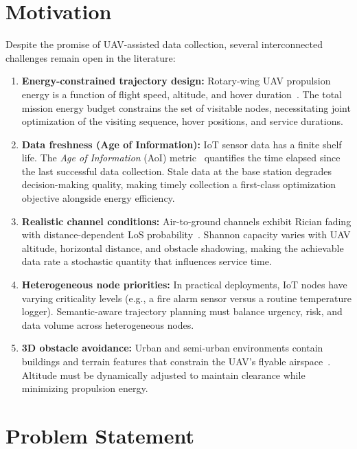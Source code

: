 \documentclass[12pt, a4paper, oneside]{report}
\begin{document}
\section{Motivation}

Despite the promise of UAV-assisted data collection, several interconnected challenges remain open in the literature:

\begin{enumerate}[label=(\roman*)]
    \item \textbf{Energy-constrained trajectory design:} Rotary-wing UAV propulsion energy is a function of flight speed, altitude, and hover duration~\cite{zeng2019energy}. The total mission energy budget constrains the set of visitable nodes, necessitating joint optimization of the visiting sequence, hover positions, and service durations.

    \item \textbf{Data freshness (Age of Information):} IoT sensor data has a finite shelf life. The \textit{Age of Information} (AoI) metric~\cite{kaul2012status} quantifies the time elapsed since the last successful data collection. Stale data at the base station degrades decision-making quality, making timely collection a first-class optimization objective alongside energy efficiency.

    \item \textbf{Realistic channel conditions:} Air-to-ground channels exhibit Rician fading with distance-dependent LoS probability~\cite{khuwaja2018survey}. Shannon capacity varies with UAV altitude, horizontal distance, and obstacle shadowing, making the achievable data rate a stochastic quantity that influences service time.

    \item \textbf{Heterogeneous node priorities:} In practical deployments, IoT nodes have varying criticality levels (e.g., a fire alarm sensor versus a routine temperature logger). Semantic-aware trajectory planning must balance urgency, risk, and data volume across heterogeneous nodes.

    \item \textbf{3D obstacle avoidance:} Urban and semi-urban environments contain buildings and terrain features that constrain the UAV's flyable airspace~\cite{aggarwal2020path}. Altitude must be dynamically adjusted to maintain clearance while minimizing propulsion energy.
\end{enumerate}

\section{Problem Statement}
\end{document}
